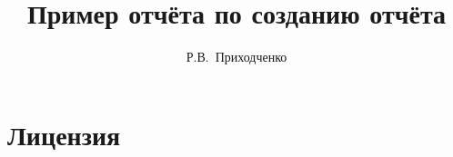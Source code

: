 
\author{Р.В.~Приходченко}
\title{Пример отчёта по созданию отчёта}
\frenchspacing


\makeindex



\renewcommand\refname{\centering Список литературы}


\maketitle

\tableofcontents


\section{Лицензия}


